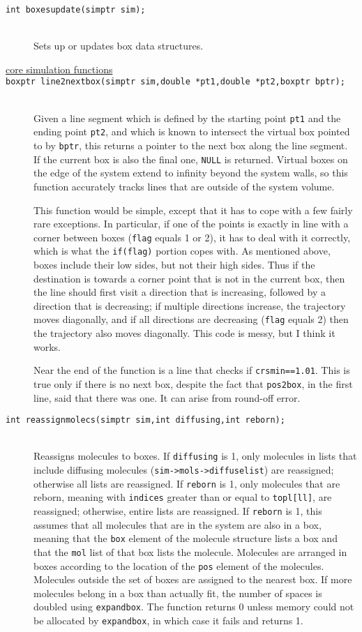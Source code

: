 \documentclass {scrbook}
\newcommand {\ttt} {\texttt}
\begin{document}
\begin{description}
\item[\ttt{int boxesupdate(simptr sim);}]
\hfill \\
Sets up or updates box data structures.

\item[\underline{core simulation functions}]

\item[\ttt{boxptr line2nextbox(simptr sim,double *pt1,double *pt2,boxptr bptr);}]
\hfill \\
Given a line segment which is defined by the starting point \ttt{pt1} and the ending point \ttt{pt2}, and which is known to intersect the virtual box pointed to by \ttt{bptr}, this returns a pointer to the next box along the line segment. If the current box is also the final one, \ttt{NULL} is returned. Virtual boxes on the edge of the system extend to infinity beyond the system walls, so this function accurately tracks lines that are outside of the system volume.

This function would be simple, except that it has to cope with a few fairly rare exceptions. In particular, if one of the points is exactly in line with a corner between boxes (\ttt{flag} equals 1 or 2), it has to deal with it correctly, which is what the \ttt{if(flag)} portion copes with. As mentioned above, boxes include their low sides, but not their high sides. Thus if the destination is towards a corner point that is not in the current box, then the line should first visit a direction that is increasing, followed by a direction that is decreasing; if multiple directions increase, the trajectory moves diagonally, and if all directions are decreasing (\ttt{flag} equals 2) then the trajectory also moves diagonally. This code is messy, but I think it works.

Near the end of the function is a line that checks if \ttt{crsmin==1.01}. This is true only if there is no next box, despite the fact that \ttt{pos2box}, in the first line, said that there was one. It can arise from round-off error.

\item[\ttt{int reassignmolecs(simptr sim,int diffusing,int reborn);}]
\hfill \\
Reassigns molecules to boxes. If \ttt{diffusing} is 1, only molecules in lists that include diffusing molecules (\ttt{sim->mols->diffuselist}) are reassigned; otherwise all lists are reassigned. If \ttt{reborn} is 1, only molecules that are reborn, meaning with \ttt{indices} greater than or equal to \ttt{topl[ll]}, are reassigned; otherwise, entire lists are reassigned. If \ttt{reborn} is 1, this assumes that all molecules that are in the system are also in a box, meaning that the \ttt{box} element of the molecule structure lists a box and that the \ttt{mol} list of that box lists the molecule. Molecules are arranged in boxes according to the location of the \ttt{pos} element of the molecules. Molecules outside the set of boxes are assigned to the nearest box. If more molecules belong in a box than actually fit, the number of spaces is doubled using \ttt{expandbox}. The function returns 0 unless memory could not be allocated by \ttt{expandbox}, in which case it fails and returns 1.


\end{description}
\end{document}
